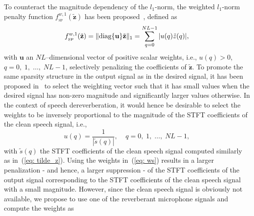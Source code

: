 \documentclass[10pt]{IEEEtran}
\begin{document}
To counteract the magnitude dependency of the $l_1$-norm, the weighted $l_1$-norm penalty function $f_{_{\text{SP}}}^{w,1}(\tilde{\mathbf{z}})$ has been proposed~\cite{Candes_FA_2008}, defined as
\begin{equation}
\label{eq: wl1_norm}
f_{_{\text{SP}}}^{w,1}(\tilde{\mathbf{z}}) = \|{\rm diag}\{\mathbf{u} \}\tilde{\mathbf{z}}\|_1 = \sum_{q = 0}^{NL-1} |u(q) \tilde{z}(q)|,
\end{equation}
with $\mathbf{u}$ an $NL$--dimensional vector of positive scalar weights, i.e., $u(q) > 0$, $q = 0, \; 1, \; \ldots, \; NL-1$,
selectively penalizing the coefficients of $\tilde{\mathbf{z}}$.
To promote the same sparsity structure in the output signal as in the desired signal, it has been proposed in~\cite{Candes_FA_2008} to select the weighting vector such that it has small values when the desired signal has non-zero magnitude and significantly larger values otherwise.
In the context of speech dereverberation, it would hence be desirable to select the weights to be inversely proportional to the magnitude of the STFT coefficients of the clean speech signal, i.e., 
\begin{equation}
\label{eq: ws}
u(q) = \frac{1}{|\tilde{s}(q)| }, \; \; \; \; q = 0, \; 1, \; \ldots, \; NL-1,
\end{equation}
with $\tilde{s}(q)$ the STFT coefficients of the clean speech signal computed similarly as in~(\ref{eq: tilde_z}).
Using the weights in~(\ref{eq: ws}) results in a larger penalization - and hence, a larger suppression - of the STFT coefficients of the output signal corresponding to the STFT coefficients of the clean speech signal with a small magnitude.
However, since the clean speech signal is obviously not available, we propose to use one of the reverberant microphone signals and compute the weights as
\end{document}
